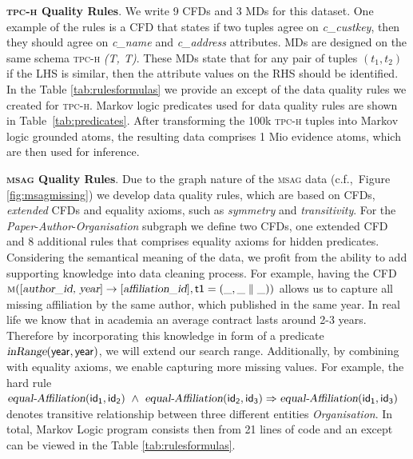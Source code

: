 \textbf{\textsc{tpc-h} Quality Rules}. We write 9 CFDs and 3 MDs for this dataset. One example of the rules is a CFD that states if two tuples agree on \textsl{c\_custkey}, then they should agree on \textsl{c\_name} and \textsl{c\_address} attributes. MDs are designed on the same schema \textsc{tpc-h} \textsl{(T, T)}. These MDs state that for any pair of tuples $(t_1,t_2)$ if the LHS is similar, then the attribute values on the RHS should be identified. In the Table \ref{tab:rulesformulas} we provide an except of the data quality rules we created for \textsc{tpc-h}. Markov logic predicates used for data quality rules are shown in Table~\ref{tab:predicates}. After transforming the 100k \textsc{tpc-h} tuples into Markov logic grounded atoms, the resulting data comprises 1 Mio evidence atoms, which are then used for inference. 

\textbf{\textsc{msag} Quality Rules}. Due to the graph nature of the \textsc{msag} data (c.f.,~Figure \ref{fig:msagmissing}) we develop data quality rules, which are based on CFDs, \textit{extended} CFDs \cite{Chen2009extended} and equality axioms, such as \textit{symmetry} and \textit{transitivity}. For the \textit{Paper}-\textit{Author}-\textit{Organisation} subgraph we define two CFDs, one extended CFD and 8 additional rules that comprises equality axioms for hidden predicates. Considering the semantical meaning of the data, we profit from the ability to add supporting knowledge into data cleaning process. For example, having the CFD $\mathsf{\textsc{m}([\textsl{author\_id, year}] \rightarrow [\textsl{affiliation\_id}],t1=(\_,\_ \parallel \_))} $  allows us to capture all missing affiliation by the same author, which published in the same year. In real life we know that in academia an average contract lasts around 2-3 years. Therefore by incorporating this knowledge in form of a predicate $\mathsf{\textsl{inRange}(year, year)}$, we will extend our search range. Additionally, by combining with equality axioms, we enable capturing more missing values. For example, the hard rule $\mathsf{\textsl{equal-Affiliation}(id_1, id_2) ~\wedge~ \textsl{equal-Affiliation}(id_2, id_3) \Rightarrow  \textsl{equal-Affiliation}(id_1, id_3)}$ denotes transitive relationship between three different entities \textit{Organisation}. In total, Markov Logic program consists then from 21 lines of code and an except can be viewed in the Table \ref{tab:rulesformulas}. 

